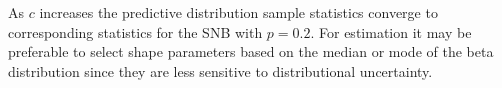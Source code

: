 \documentclass[review]{elsarticle}
\begin{document}
As $c$ increases the 
predictive distribution sample statistics converge to corresponding 
statistics for the SNB with $p = 0.2$. 
For estimation it may be 
preferable to select shape parameters based on the median or mode of the 
beta distribution since they are less sensitive to distributional uncertainty.

%


\end{document}
